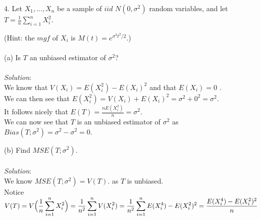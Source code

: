 \documentclass[12pt]{article}
\newcommand{\XB}{\color{black}}
\newcommand{\XBB}{\color{blue}}
\begin{document}
4. Let $ X_{1}, \dots, X_{n} $ be a sample of $ iid $ $ N(0, \sigma^{2}) $ random variables, and let $ \displaystyle T = \frac{1}{n} \sum_{i=1}^{n} X_{i}^{2} $.

(Hint: the $ mgf $ of $ X_{i} $ is $ \displaystyle M(t) = e^{\sigma^{2}t^{2}/2} $.) \\

\XBB\hrulefill\XB
\vspace{5mm} \\


(a) Is $ T $ an unbiased estimator of $ \sigma^{2} $? \\
\vspace{2.5mm} \\
\textit{Solution}:
\vspace{2.5mm} \\

\noindent
We know that $ V(X_{i}) = E(X_{i}^{2}) - E(X_{i})^{2} $ and that $ E(X_{i}) = 0 $ . \\

\noindent
We can then see that $ E(X_{i}^{2}) = V(X_{i}) + E(X_{i})^{2} = \sigma^{2} + 0^{2} = \sigma^{2} $. \\

\noindent
It follows nicely that $ \displaystyle E(T) = \frac{nE(X_{i}^{2})}{n} = \sigma^{2} $. \\

\noindent
We can now see that $ T $ is an unbiased estimator of $ \sigma^{2} $ as $ Bias(T; \sigma^{2}) = \sigma^{2} - \sigma^{2} = 0 $. \\
\newpage


(b) Find $ MSE(T; \sigma^{2}) $. \\
\vspace{2.5mm} \\
\textit{Solution}:
\vspace{2.5mm} \\

\noindent
We know $ MSE(T; \sigma^{2}) = V(T) $. as $ T $ is unbiased. \\

\noindent
Notice $ \displaystyle V(T) = V\Bigl( \frac{1}{n} \sum_{i=1}^{n} X_{i}^{2} \Bigr) = \frac{1}{n^{2}} \sum_{i=1}^{n} V(X_{i}^{2}) = \frac{1}{n^{2}} \sum_{i=1}^{n} E(X_{i}^{4}) - E(X_{i}^{2})^{2} = \frac{E(X_{i}^{4}) - E(X_{i}^{2})^{2}}{n} $ \\
\end{document}
